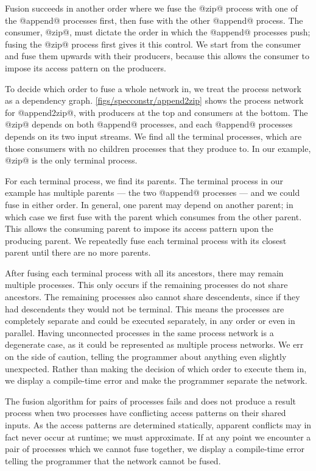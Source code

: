 Fusion succeeds in another order where we fuse the @zip@ process with one of the @append@ processes first, then fuse with the other @append@ process.
The consumer, @zip@, must dictate the order in which the @append@ processes push; fusing the @zip@ process first gives it this control.
We start from the consumer and fuse them upwards with their producers, because this allows the consumer to impose its access pattern on the producers.



To decide which order to fuse a whole network in, we treat the process network as a dependency graph.
\autoref{figs/specconstr/append2zip} shows the process network for @append2zip@, with producers at the top and consumers at the bottom.
The @zip@ depends on both @append@ processes, and each @append@ processes depends on its two input streams.
We find all the terminal processes, which are those consumers with no children processes that they produce to.
In our example, @zip@ is the only terminal process.

For each terminal process, we find its parents.
The terminal process in our example has multiple parents --- the two @append@ processes --- and we could fuse in either order.
In general, one parent may depend on another parent; in which case we first fuse with the parent which consumes from the other parent.
This allows the consuming parent to impose its access pattern upon the producing parent.
We repeatedly fuse each terminal process with its closest parent until there are no more parents.

After fusing each terminal process with all its ancestors, there may remain multiple processes.
This only occurs if the remaining processes do not share ancestors.
The remaining processes also cannot share descendents, since if they had descendents they would not be terminal.
This means the processes are completely separate and could be executed separately, in any order or even in parallel.
Having unconnected processes in the same process network is a degenerate case, as it could be represented as multiple process networks.
We err on the side of caution, telling the programmer about anything even slightly unexpected.
Rather than making the decision of which order to execute them in, we display a compile-time error and make the programmer separate the network.

The fusion algorithm for pairs of processes fails and does not produce a result process when two processes have conflicting access patterns on their shared inputs.
As the access patterns are determined statically, apparent conflicts may in fact never occur at runtime; we must approximate.
If at any point we encounter a pair of processes which we cannot fuse together, we display a compile-time error telling the programmer that the network cannot be fused.

